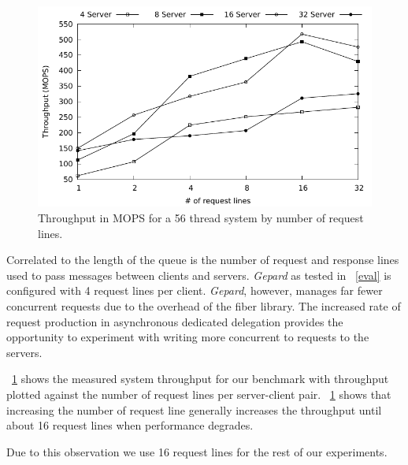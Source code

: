 \documentclass{uicthesi}
\begin{document}
\begin{figure}[ht!]
\centering
\includegraphics[width=0.9\columnwidth]{FIG/thput_by_rl.pdf}
\caption{Throughput in MOPS for a 56 thread system by number of request lines. }
\label{fig:dedicated_thput_by_rl}
\end{figure}

Correlated to the length of the queue is the number of request and response lines used to pass messages between clients and servers. \textit{Gepard} as tested in ~\autoref{eval} is configured with 4 request lines per client. \textit{Gepard}, however, manages far fewer concurrent requests due to the overhead of the fiber library. The increased rate of request production in asynchronous dedicated delegation provides the opportunity to experiment with writing more concurrent to requests to the servers. 

~\ref{fig:dedicated_thput_by_rl} shows the measured system throughput for our benchmark with throughput plotted against the number of request lines per server-client pair. ~\ref{fig:dedicated_thput_by_rl} shows that increasing the number of request line generally increases the throughput until about 16 request lines when performance degrades. 

Due to this observation we use 16 request lines for the rest of our experiments. 
\end{document}
